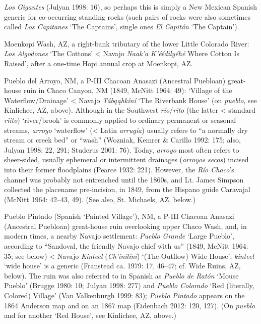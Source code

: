 \textit{Los Gigantes} (Julyan 1998: 16), so perhaps this is simply a New Mexican Spanish generic for co-occurring standing rocks (such pairs of rocks were also sometimes called \textit{Los Capitanes} ‘The Captains’, single ones \textit{El Capitán} ‘The Captain’).

Moenkopi Wash, AZ, a right-bank tributary of the lower Little Colorado River: \textit{Los Algodones} ‘The Cottons’ {\textless} Navajo \textit{Naak’a K’éédilyéhé} Where Cotton Is Raised’, after a one-time Hopi annual crop at Moenkopi, AZ.

Pueblo del Arroyo, NM, a P-III Chacoan Anasazi (Ancestral Puebloan) great-house ruin in Chaco Canyon, NM (1849, McNitt 1964: 49):  ‘Village of the Waterflow/Drainage’ {\textless} Navajo \textit{Tábąąhkíní} ‘The Riverbank House’ (on \textit{pueblo}, see Kinlichee, AZ, above).  Although in the Southwest \textit{río}/\textit{rito} (the latter {\textless} standard \textit{riíto}) ‘river/brook’ is commonly applied to ordinary permanent or seasonal streams, \textit{arroyo} ‘waterflow’ ({\textless} Latin \textit{arrugia}) usually refers to “a normally dry stream or creek bed” or “wash” (Wozniak, Kemrer \& Carillo 1992: 175; also, Julyan 1998: 22, 291; Studerus 2001: 76).  Today, \textit{arroyo} most often refers to sheer-sided, usually ephemeral or intermittent drainages (\textit{arroyos secos}) incised into their former floodplains (Pearce 1932: 221).  However, the \textit{Río Chaco}’s channel was probably not entrenched until the 1860s, and Lt. James Simpson collected the placename pre-incision, in 1849, from the Hispano guide Caravajal (McNitt 1964: 42–43, 49).  (See also, St. Michaels, AZ, below.)

Pueblo Pintado (Spanish ‘Painted Village’), NM, a P-III Chacoan Anasazi (Ancestral Puebloan) great-house ruin overlooking upper Chaco Wash, and, in modern times, a nearby Navajo settlement:  \textit{Pueblo Grande} ‘Large Pueblo’, according to “Sandoval, the friendly Navajo chief with us” (1849, McNitt 1964: 35; see below) {\textless} Navajo \textit{Kinteel }(\textit{Ch’ínílíní}) ‘(The-Outflow) Wide House’; \textit{kinteel} ‘wide house’ is a generic (Franstead ca. 1979: 17, 46–47; cf. Wide Ruins, AZ, below).  The ruin was also referred to in Spanish as \textit{Pueblo de Ratón} ‘Mouse Pueblo’ (Brugge 1980: 10; Julyan 1998: 277) and \textit{Pueblo Colorado }‘Red  (literally, Colored) Village’ (Van Valkenburgh 1999: 83); \textit{Pueblo Pintado} appears on the 1864 Anderson map and on an 1867 map (Eidenbach 2012: 120, 127).  (On \textit{pueblo} and for another ‘Red House’, see Kinlichee, AZ, above.)

